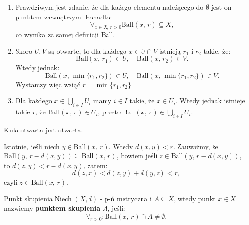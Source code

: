 \documentclass{article}
\newcounter{defi}
\numberwithin{defi}{section}
\numberwithin{defi}{section}
\newcommand{\ball}[2]{\text{Ball}(#1, \, #2)}
\begin{document}
\begin{dow}
    \begin{enumerate}
        \item Prawdziwym jest zdanie, że dla każego elementu należącego do $\emptyset$ jest on punktem wewnętrzym. Ponadto: \begin{equation}
                  \forall_{x \in X,\, r > 0} \ball{x}{r} \subseteq X,
              \end{equation}
              co wynika za samej definicji Ball.

        \item Skoro $U, V$ są otwarte, to dla każdego $x \in U \cap V$ istnieją $r_1$ i $r_2$ takie, że:\begin{equation*}
                  \ball{x}{r_1} \in U, \quad \ball{x}{r_2} \in V.
              \end{equation*} Wtedy jednak: \begin{equation*}
                  \ball{x}{\min\{r_1, r_2\}} \in U, \quad \ball{x}{\min\{r_1, r_2\}} \in V.
              \end{equation*} Wystarczy więc wziąć $r = \min\{r_1, r_2\}$

        \item Dla każdego $x \in \bigcup_{i \in I} U_i$ mamy $i \in I$ takie, że $x \in U_i$. Wtedy jednak istnieje takie $r$, że $\ball{x}{r} \in U_i$, przeto $\ball{x}{r} \in \bigcup_{i \in I} U_i$.

    \end{enumerate}

\end{dow}

\begin{twier}{}
    Kula otwarta jest otwarta.
\end{twier}

\begin{dow}
    Istotnie, jeśli niech $y \in \ball{x}{r}$. Wtedy $d(x, y) < r$. Zauważmy, że $\ball{y}{r - d(x, y)} \subseteq \ball{x}{r}$, bowiem jeśli $z \in \ball{y}{r - d(x, y)}$, to $d(z, y) < r - d(x, y)$, zatem: \begin{equation*}
        d(z, x) < d(z, y) + d(y, z) < r,
    \end{equation*} czyli $z \in \ball{x}{r}$.
\end{dow}



\begin{defr}{Punkt skupienia}
    Niech $(X, d)$ - p-ń metryczna i $A \subseteq X$, wtedy punkt $x \in X$ nazwiemy \textbf{punktem skupienia} $A$, jeśli: \begin{equation}
        \forall_{r>0}: \ball{x}{r} \cap A \neq \emptyset.
    \end{equation}
\end{defr}
\end{document}
